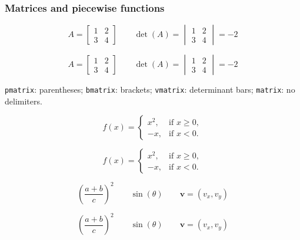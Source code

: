 
\begin{nobreaks}
\subsubsection*{Matrices and piecewise functions}
\label{matrices}
\begin{referencecode}
\[
    A = \begin{bmatrix}
        1 & 2 \\
        3 & 4
    \end{bmatrix}
    \qquad
    \det(A) = \begin{vmatrix}
        1 & 2 \\
        3 & 4
    \end{vmatrix} = -2
\]
\end{referencecode}

\[
    A = \begin{bmatrix}
        1 & 2 \\
        3 & 4
    \end{bmatrix}
    \qquad
    \det(A) = \begin{vmatrix}
        1 & 2 \\
        3 & 4
    \end{vmatrix} = -2
\]

\texttt{pmatrix}: parentheses; \texttt{bmatrix}: brackets;
\texttt{vmatrix}: determinant bars; \texttt{matrix}: no delimiters.
\end{nobreaks}

\begin{referencecode}
\[
    f(x) = \begin{cases}
        x^2, & \text{if } x \geq 0, \\
        -x,  & \text{if } x < 0.
    \end{cases}
\]
\end{referencecode}

\[
    f(x) = \begin{cases}
        x^2, & \text{if } x \geq 0, \\
        -x,  & \text{if } x < 0.
    \end{cases}
\]

\begin{referencecode}
\[
    \left(\frac{a+b}{c}\right)^2
    \qquad \sin(\theta)
    \qquad \mathbf{v} = (v_x,v_y)
\]
\end{referencecode}

\[
    \left(\frac{a+b}{c}\right)^2
    \qquad \sin(\theta)
    \qquad \mathbf{v} = (v_x,v_y)
\]

